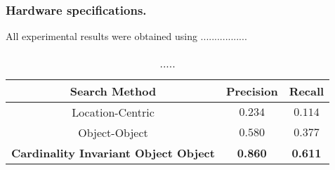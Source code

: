 \subsubsection{Hardware specifications.} 
All experimental results were obtained using .................

\small{
\begin{table}[h]
    \begin{center}
        \begin{tabular}{ |c|c|c| } 
            \hline
            Search Method & Precision & Recall\\
            \hline
            Location-Centric & $0.234$ & $0.114$ \\ 
            Object-Object & $0.580$ & $0.377$ \\  
            \textbf{Cardinality Invariant Object Object} & \textbf{0.860} & \textbf{0.611} \\ 
            \hline     
        \end{tabular}
        \caption{.....} 
        \label{Table:RecallResults}
    \end{center}
\end{table}
}


